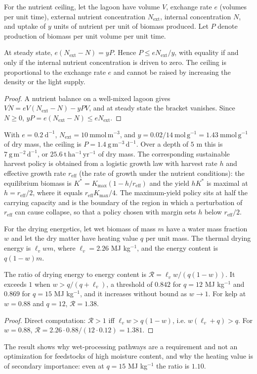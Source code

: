 For the nutrient ceiling, let the lagoon have volume $V$, exchange rate $e$ (volumes per unit time), external nutrient concentration $N_{\mathrm{ext}}$, internal concentration $N$, and uptake of $y$ units of nutrient per unit of biomass produced. Let $P$ denote production of biomass per unit volume per unit time.

\begin{proposition}
At steady state, $e(N_{\mathrm{ext}}-N)=yP$. Hence $P\le eN_{\mathrm{ext}}/y$, with equality if and only if the internal nutrient concentration is driven to zero. The ceiling is proportional to the exchange rate $e$ and cannot be raised by increasing the density or the light supply.
\end{proposition}

\begin{proof}
A nutrient balance on a well-mixed lagoon gives $V\dot N=eV(N_{\mathrm{ext}}-N)-yPV$, and at steady state the bracket vanishes. Since $N\ge0$, $yP=e(N_{\mathrm{ext}}-N)\le eN_{\mathrm{ext}}$.
\end{proof}

With $e=0.2\ \mathrm{d^{-1}}$, $N_{\mathrm{ext}}=10\ \mathrm{mmol\,m^{-3}}$, and $y=0.02/14\ \mathrm{mol\,g^{-1}}=1.43\ \mathrm{mmol\,g^{-1}}$ of dry mass, the ceiling is $P=1.4\ \mathrm{g\,m^{-3}\,d^{-1}}$. Over a depth of $5$ m this is $7\ \mathrm{g\,m^{-2}\,d^{-1}}$, or $25.6\ \mathrm{t\,ha^{-1}\,yr^{-1}}$ of dry mass. The corresponding sustainable harvest policy is obtained from a logistic growth law with harvest rate $h$ and effective growth rate $r_{\mathrm{eff}}$ (the rate of growth under the nutrient conditions): the equilibrium biomass is $K^\ast=K_{\max}(1-h/r_{\mathrm{eff}})$ and the yield $hK^\ast$ is maximal at $h=r_{\mathrm{eff}}/2$, where it equals $r_{\mathrm{eff}}K_{\max}/4$. The maximum-yield policy sits at half the carrying capacity and is the boundary of the region in which a perturbation of $r_{\mathrm{eff}}$ can cause collapse, so that a policy chosen with margin sets $h$ below $r_{\mathrm{eff}}/2$.

For the drying energetics, let wet biomass of mass $m$ have a water mass fraction $w$ and let the dry matter have heating value $q$ per unit mass. The thermal drying energy is $\ell_v wm$, where $\ell_v=2.26$ MJ kg$^{-1}$, and the energy content is $q(1-w)m$.

\begin{proposition}
The ratio of drying energy to energy content is $\mathcal R=\ell_vw/(q(1-w))$. It exceeds $1$ when $w>q/(q+\ell_v)$, a threshold of $0.842$ for $q=12$ MJ kg$^{-1}$ and $0.869$ for $q=15$ MJ kg$^{-1}$, and it increases without bound as $w\to1$. For kelp at $w=0.88$ and $q=12$, $\mathcal R=1.38$.
\end{proposition}

\begin{proof}
Direct computation: $\mathcal R>1$ iff $\ell_vw>q(1-w)$, i.e. $w(\ell_v+q)>q$. For $w=0.88$, $\mathcal R=2.26\cdot0.88/(12\cdot0.12)=1.381$.
\end{proof}

The result shows why wet-processing pathways are a requirement and not an optimization for feedstocks of high moisture content, and why the heating value is of secondary importance: even at $q=15$ MJ kg$^{-1}$ the ratio is $1.10$.
